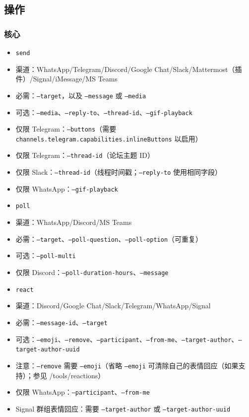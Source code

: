 \subsection{操作}


\subsubsection{核心}


\begin{itemize}
  \item \texttt{send}
  \item 渠道：WhatsApp/Telegram/Discord/Google Chat/Slack/Mattermost（插件）/Signal/iMessage/MS Teams
  \item 必需：\texttt{--target}，以及 \texttt{--message} 或 \texttt{--media}
  \item 可选：\texttt{--media}、\texttt{--reply-to}、\texttt{--thread-id}、\texttt{--gif-playback}
  \item 仅限 Telegram：\texttt{--buttons}（需要 \texttt{channels.telegram.capabilities.inlineButtons} 以启用）
  \item 仅限 Telegram：\texttt{--thread-id}（论坛主题 ID）
  \item 仅限 Slack：\texttt{--thread-id}（线程时间戳；\texttt{--reply-to} 使用相同字段）
  \item 仅限 WhatsApp：\texttt{--gif-playback}
\end{itemize}


\begin{itemize}
  \item \texttt{poll}
  \item 渠道：WhatsApp/Discord/MS Teams
  \item 必需：\texttt{--target}、\texttt{--poll-question}、\texttt{--poll-option}（可重复）
  \item 可选：\texttt{--poll-multi}
  \item 仅限 Discord：\texttt{--poll-duration-hours}、\texttt{--message}
\end{itemize}


\begin{itemize}
  \item \texttt{react}
  \item 渠道：Discord/Google Chat/Slack/Telegram/WhatsApp/Signal
  \item 必需：\texttt{--message-id}、\texttt{--target}
  \item 可选：\texttt{--emoji}、\texttt{--remove}、\texttt{--participant}、\texttt{--from-me}、\texttt{--target-author}、\texttt{--target-author-uuid}
  \item 注意：\texttt{--remove} 需要 \texttt{--emoji}（省略 \texttt{--emoji} 可清除自己的表情回应（如果支持）；参见 /tools/reactions）
  \item 仅限 WhatsApp：\texttt{--participant}、\texttt{--from-me}
  \item Signal 群组表情回应：需要 \texttt{--target-author} 或 \texttt{--target-author-uuid}
\end{itemize}


